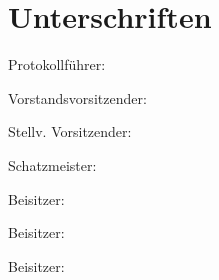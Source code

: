 \documentclass[a4paper,12pt]{scrartcl}
\begin{document}
\section{Unterschriften}
\vspace{0.7cm}
\noindent Protokollführer: \hrulefill\hfill\phantom{c}\par
\vspace{0.7cm}
\noindent Vorstandsvorsitzender: \hrulefill\hfill\phantom{c}\par
\vspace{0.7cm}
\noindent Stellv. Vorsitzender: \hrulefill\hfill\phantom{c}\par
\vspace{0.7cm}
\noindent Schatzmeister: \hrulefill\hfill\phantom{c}\par
\vspace{0.7cm}
\noindent Beisitzer: \hrulefill\hfill\phantom{c}\par
\vspace{0.7cm}
\noindent Beisitzer: \hrulefill\hfill\phantom{c}\par
\vspace{0.7cm}
\noindent Beisitzer: \hrulefill\hfill\phantom{c}\par
\end{document}
